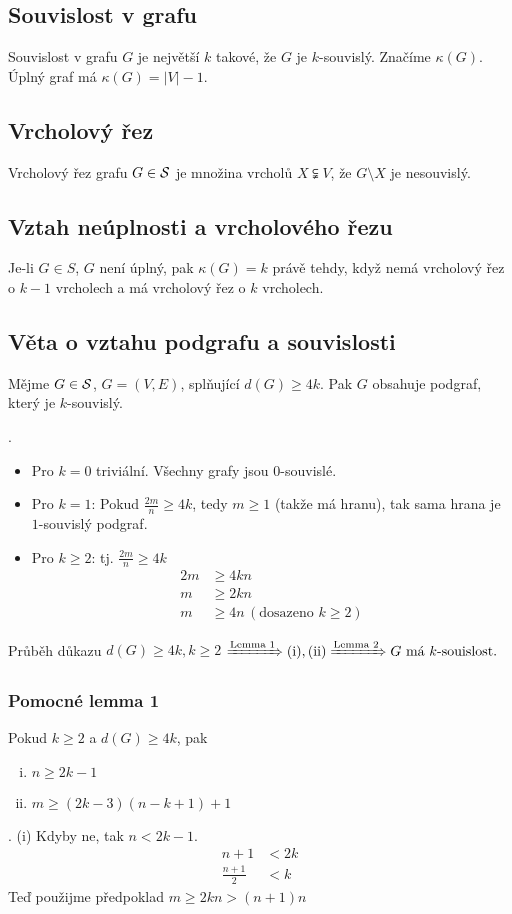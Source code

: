 \subsection{Souvislost v grafu}
Souvislost v grafu $G$ je největší $k$ takové, že $G$ je $k$-souvislý. Značíme $\kappa(G)$. \\ Úplný graf má 
$\kappa(G) = |V|-1$.

\subsection{Vrcholový řez}\label{vrchRez}
Vrcholový řez grafu $G \in \S$ je množina vrcholů $X \subsetneqq V$, že $G \setminus X$ je nesouvislý.

\subsection{Vztah neúplnosti a vrcholového řezu}
Je-li $G \in S$, $G$ není úplný, pak $\kappa(G)=k$ právě tehdy, když nemá vrcholový řez o $k-1$ vrcholech a má vrcholový 
řez o $k$ vrcholech.

\subsection{Věta o vztahu podgrafu a souvislosti}
Mějme $G \in \S$, $G = (V,E)$, splňující $d(G) \geq 4k$. Pak $G$ obsahuje podgraf, který je $k$-souvislý.

. 
\begin{itemize}
    \item Pro $k=0$ triviální. Všechny grafy jsou $0$-souvislé.
    \item Pro $k=1$: Pokud $\frac{2m}{n} \geq 4k$, tedy $m \geq 1$ (takže má hranu), tak sama hrana je $1$-souvislý 
    podgraf.
    \item Pro $k \geq 2$: tj. $\frac{2m}{n} \geq 4k$
    \begin{align*}
        2m &\geq 4kn \\
        m &\geq 2kn \\
        m &\geq 4n \, (\text{dosazeno } k \geq 2)
    \end{align*}
\end{itemize}
Průběh důkazu $d(G) \geq 4k, k\geq 2$ $\xRightarrow{\text{Lemma 1}} (\text{i}), (\text{ii}) \xRightarrow{\text{Lemma 2}} 
G \text{ má } k \text{-souislost.}$
\subsubsection{Pomocné lemma 1}
Pokud $k \geq 2$ a $d(G) \geq 4k$, pak
\begin{enumerate}[(i), noitemsep]
    \item $n \geq 2k-1$
    \item $m \geq (2k-3)(n-k+1)+1$
\end{enumerate}
. (i) Kdyby ne, tak $n<2k-1$.
\begin{align*}
    n+1 &< 2k\\
    \frac{n+1}{2} &<k
\end{align*}
Teď použijme předpoklad $m \geq 2kn > (n+1)n$ %

